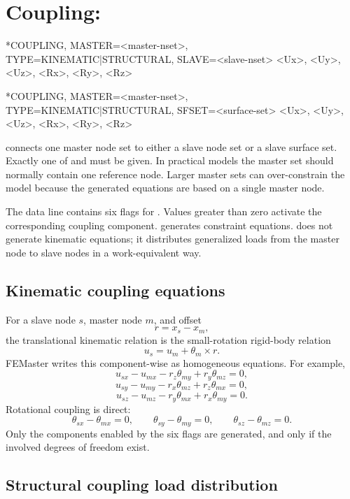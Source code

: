 \section{Coupling: }

\begin{syntax}
*COUPLING, MASTER=<master-nset>, TYPE=KINEMATIC|STRUCTURAL, SLAVE=<slave-nset>
<Ux>, <Uy>, <Uz>, <Rx>, <Ry>, <Rz>
\end{syntax}

\begin{syntax}
*COUPLING, MASTER=<master-nset>, TYPE=KINEMATIC|STRUCTURAL, SFSET=<surface-set>
<Ux>, <Uy>, <Uz>, <Rx>, <Ry>, <Rz>
\end{syntax}

 connects one master node set to either a slave node set or a slave surface set. Exactly one of  and  must be given. In practical models the master set should normally contain one reference node. Larger master sets can over-constrain the model because the generated equations are based on a single master node.

The data line contains six flags for \dofvec. Values greater than zero activate the corresponding coupling component.  generates constraint equations.  does not generate kinematic equations; it distributes generalized loads from the master node to slave nodes in a work-equivalent way.

\subsection{Kinematic coupling equations}

For a slave node \(s\), master node \(m\), and offset
\[
r = x_s - x_m ,
\]
the translational kinematic relation is the small-rotation rigid-body relation
\[
u_s = u_m + \theta_m \times r .
\]
FEMaster writes this component-wise as homogeneous equations. For example,
\[
u_{sx} - u_{mx} - r_z\theta_{my} + r_y\theta_{mz}=0,
\]
\[
u_{sy} - u_{my} - r_x\theta_{mz} + r_z\theta_{mx}=0,
\]
\[
u_{sz} - u_{mz} - r_y\theta_{mx} + r_x\theta_{my}=0.
\]
Rotational coupling is direct:
\[
\theta_{sx}-\theta_{mx}=0,\qquad
\theta_{sy}-\theta_{my}=0,\qquad
\theta_{sz}-\theta_{mz}=0.
\]
Only the components enabled by the six flags are generated, and only if the involved degrees of freedom exist.

\subsection{Structural coupling load distribution}

